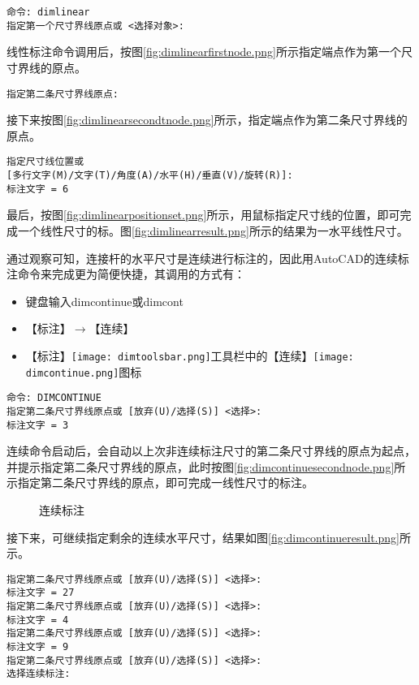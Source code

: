 \begin{procedure}
\begin{lstlisting}
命令: dimlinear
指定第一个尺寸界线原点或 <选择对象>:
\end{lstlisting}

线性标注命令调用后，按图\ref{fig:dimlinearfirstnode.png}所示指定端点作为第一个尺寸界线的原点。
\begin{lstlisting}
指定第二条尺寸界线原点:
\end{lstlisting}

接下来按图\ref{fig:dimlinearsecondtnode.png}所示，指定端点作为第二条尺寸界线的原点。
\begin{lstlisting}
指定尺寸线位置或
[多行文字(M)/文字(T)/角度(A)/水平(H)/垂直(V)/旋转(R)]:
标注文字 = 6
\end{lstlisting}

最后，按图\ref{fig:dimlinearpositionset.png}所示，用鼠标指定尺寸线的位置，即可完成一个线性尺寸的标。图\ref{fig:dimlinearresult.png}所示的结果为一水平线性尺寸。

通过观察可知，连接杆的水平尺寸是连续进行标注的，因此用AutoCAD的连续标注命令来完成更为简便快捷，其调用的方式有：
\begin{itemize}
\item 键盘输入dimcontinue或dimcont
\item 【标注】$\rightarrow $【连续】
\item 【标注】\texttt{[image: dimtoolsbar.png]}工具栏中的【连续】\texttt{[image: dimcontinue.png]}图标
\end{itemize}
\begin{lstlisting}
命令: DIMCONTINUE
指定第二条尺寸界线原点或 [放弃(U)/选择(S)] <选择>:
标注文字 = 3
\end{lstlisting}

连续命令启动后，会自动以上次非连续标注尺寸的第二条尺寸界线的原点为起点，并提示指定第二条尺寸界线的原点，此时按图\ref{fig:dimcontinuesecondnode.png}所示指定第二条尺寸界线的原点，即可完成一线性尺寸的标注。

\begin{figure}[htbp]
\centering
{}\hspace{20pt}
\caption{连续标注}
\end{figure}

接下来，可继续指定剩余的连续水平尺寸，结果如图\ref{fig:dimcontinueresult.png}所示。
\begin{lstlisting}
指定第二条尺寸界线原点或 [放弃(U)/选择(S)] <选择>:
标注文字 = 27
指定第二条尺寸界线原点或 [放弃(U)/选择(S)] <选择>:
标注文字 = 4
指定第二条尺寸界线原点或 [放弃(U)/选择(S)] <选择>:
标注文字 = 9
指定第二条尺寸界线原点或 [放弃(U)/选择(S)] <选择>:
选择连续标注:
\end{lstlisting}


\end{procedure}
